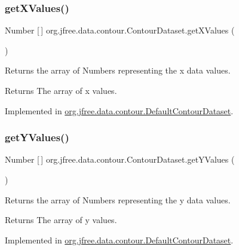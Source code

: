 \subsubsection{\texorpdfstring{get\+X\+Values()}{getXValues()}}
{\footnotesize\ttfamily Number \mbox{[}$\,$\mbox{]} org.\+jfree.\+data.\+contour.\+Contour\+Dataset.\+get\+X\+Values (\begin{DoxyParamCaption}{ }\end{DoxyParamCaption})}

Returns the array of Numbers representing the x data values.

\begin{DoxyReturn}{Returns}
The array of x values. 
\end{DoxyReturn}


Implemented in \mbox{\hyperlink{classorg_1_1jfree_1_1data_1_1contour_1_1_default_contour_dataset_a8a4966b63f2a288bf72c93d8c00341b7}{org.\+jfree.\+data.\+contour.\+Default\+Contour\+Dataset}}.

\mbox{\label{interfaceorg_1_1jfree_1_1data_1_1contour_1_1_contour_dataset_a0faf9e126a0ff7c38e59c2f56cec0ee9}} 
\subsubsection{\texorpdfstring{get\+Y\+Values()}{getYValues()}}
{\footnotesize\ttfamily Number \mbox{[}$\,$\mbox{]} org.\+jfree.\+data.\+contour.\+Contour\+Dataset.\+get\+Y\+Values (\begin{DoxyParamCaption}{ }\end{DoxyParamCaption})}

Returns the array of Numbers representing the y data values.

\begin{DoxyReturn}{Returns}
The array of y values. 
\end{DoxyReturn}


Implemented in \mbox{\hyperlink{classorg_1_1jfree_1_1data_1_1contour_1_1_default_contour_dataset_a0f3d5f992c8fdb948d8d07d5d4058ef9}{org.\+jfree.\+data.\+contour.\+Default\+Contour\+Dataset}}.

